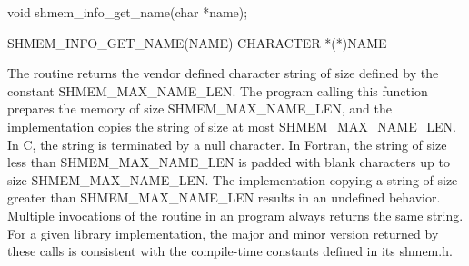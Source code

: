 \synC   %

void shmem_info_get_name(char *name); %

\synF   %

SHMEM_INFO_GET_NAME(NAME)   
CHARACTER *(*)NAME %

{
\color{red}
  The routine returns the vendor defined character string of size defined by the 
  constant SHMEM\_MAX\_NAME\_LEN. The program calling this function 
  prepares the memory of size SHMEM\_MAX\_NAME\_LEN, and the implementation copies the 
  string of size at most SHMEM\_MAX\_NAME\_LEN. In C, the string is terminated by a null character. 
  In Fortran, the string of size less than SHMEM\_MAX\_NAME\_LEN is padded with blank characters up to 
  size SHMEM\_MAX\_NAME\_LEN. The implementation copying a string of size greater than SHMEM\_MAX\_NAME\_LEN results 
  in an undefined behavior.
  Multiple invocations of the 
  routine in an \openshmem{} program always returns the same string. 
  For a given library implementation, the major and minor version returned by these calls is consistent with the compile-time constants defined in its shmem.h.
  \color{black}
}
{
}
\eAPI

